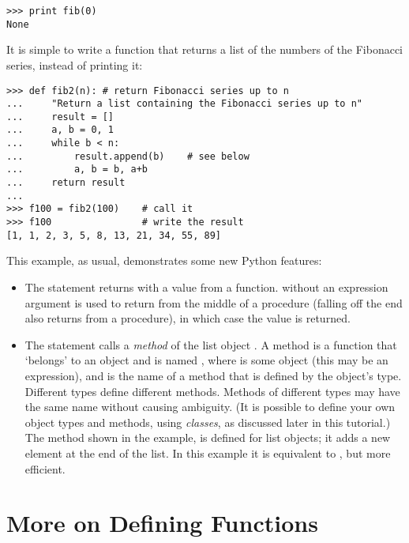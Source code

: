\documentclass{manual}
\begin{document}
\begin{verbatim}
>>> print fib(0)
None
\end{verbatim}

It is simple to write a function that returns a list of the numbers of
the Fibonacci series, instead of printing it:

\begin{verbatim}
>>> def fib2(n): # return Fibonacci series up to n
...     "Return a list containing the Fibonacci series up to n"
...     result = []
...     a, b = 0, 1
...     while b < n:
...         result.append(b)    # see below
...         a, b = b, a+b
...     return result
... 
>>> f100 = fib2(100)    # call it
>>> f100                # write the result
[1, 1, 2, 3, 5, 8, 13, 21, 34, 55, 89]
\end{verbatim}
%
This example, as usual, demonstrates some new Python features:

\begin{itemize}

\item
The  statement returns with a value from a function.
 without an expression argument is used to return from 
the middle of a procedure (falling off the end also returns from a
procedure), in which case the  value is returned.

\item
The statement  calls a \emph{method} of the list
object .  A method is a function that `belongs' to an
object and is named , where  is some
object (this may be an expression), and  is the name
of a method that is defined by the object's type.  Different types
define different methods.  Methods of different types may have the
same name without causing ambiguity.  (It is possible to define your
own object types and methods, using \emph{classes}, as discussed later
in this tutorial.)
The method  shown in the example, is defined for
list objects; it adds a new element at the end of the list.  In this
example it is equivalent to , but more
efficient.

\end{itemize}

\section{More on Defining Functions \label{defining}}
\end{document}
